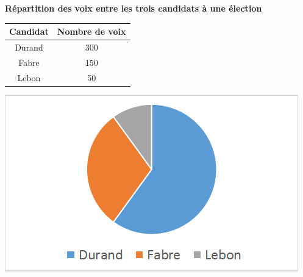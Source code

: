 
\begin{myex}
	
	\textbf{Répartition des voix entre les trois candidats à une élection}
	
	\begin{multicols*}{2}
	
		\begin{center}
			\begin{tabular}{|@{\ }c@{\ }|@{\ }c@{\ }|}
				\hline
				Candidat & Nombre de voix \\ \hline
				Durand & 300  \\ \hline
				Fabre & 150 \\ \hline
				Lebon & 50 \\ \hline
			\end{tabular}
		\end{center}
		
		
		\includegraphics[scale=0.8]{img/sect1}
	\end{multicols*}
	
\end{myex}

